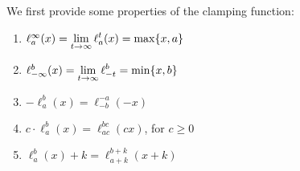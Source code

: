 \begin{theorem}
    We first provide some properties of the clamping function:
    \begin{enumerate}
        \item $\ell_{a}^{\infty}(x)=\displaystyle\lim_{t\to\infty}\ell_{a}^{t}(x)=\max\{x,a\}$
        \item $\ell_{-\infty}^{b}(x)=\displaystyle\lim_{t\to\infty}\ell_{-t}^{b}=\min\{x,b\}$
        \item $-\ell_{a}^{b}(x)=\ell_{-b}^{-a}(-x)$
        \item $c\cdot\ell_{a}^{b}(x)=\ell_{ac}^{bc}(cx)$, for $c\geq 0$
        \item $\ell_{a}^{b}(x)+k=\ell_{a+k}^{b+k}(x+k)$
    \end{enumerate}
\end{theorem}
